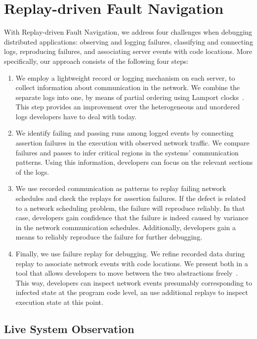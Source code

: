 \chapter{Replay-driven Fault Navigation}
\label{cha:solution-design}

With Replay-driven Fault Navigation, we address four challenges when
debugging distributed applications: observing and logging failures,
classifying and connecting logs, reproducing failures, and associating
server events with code locations. More specifically, our approach
consists of the following four steps:

\begin{enumerate}
\item We employ a lightweight record or logging mechanism on each
  server, to collect information about communication in the
  network. We combine the separate logs into one, by means of partial
  ordering using Lamport clocks~\cite{lamport1978time}. This step
  provides an improvement over the heterogeneous and unordered logs
  developers have to deal with today.
\item We identify failing and passing runs among logged events by
  connecting assertion failures in the execution with observed network
  traffic. We compare failures and passes to infer critical regions in
  the systems' communication patterns. Using this information,
  developers can focus on the relevant sections of the logs.
\item We use recorded communication as patterns to replay failing
  network schedules and check the replays for assertion failures. If
  the defect is related to a network scheduling problem, the failure
  will reproduce reliably. In that case, developers gain confidence
  that the failure is indeed caused by variance in the network
  communication schedules. Additionally, developers gain a means to
  reliably reproduce the failure for further debugging.
\item Finally, we use failure replay for debugging. We refine recorded
  data during replay to associate network events with code
  locations. We present both in a tool that allows developers to move
  between the two abstractions freely~\cite{Stanley2009}. This way,
  developers can inspect network events presumably corresponding to
  infected state at the program code level, an use additional replays
  to inspect execution state at this point.
\end{enumerate}

\section{Live System Observation}
\label{sec:lightweight-tracing}

